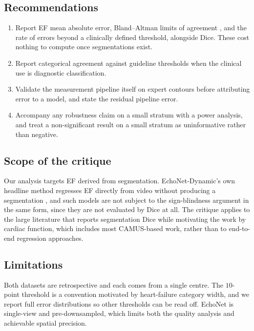 \documentclass[conference,a4paper]{IEEEtran}
\begin{document}
\subsection{Recommendations}
\begin{enumerate}
\item Report EF mean absolute error, Bland--Altman limits of agreement
      \cite{blandaltman1986}, and the rate of errors beyond a clinically defined threshold,
      alongside Dice. These cost nothing to compute once segmentations exist.
\item Report categorical agreement against guideline thresholds \cite{mcdonagh2021} when
      the clinical use is diagnostic classification.
\item Validate the measurement pipeline itself on expert contours before attributing error
      to a model, and state the residual pipeline error.
\item Accompany any robustness claim on a small stratum with a power analysis, and treat a
      non-significant result on a small stratum as uninformative rather than negative.
\end{enumerate}

\subsection{Scope of the critique}
Our analysis targets EF derived from segmentation. EchoNet-Dynamic's own headline method
regresses EF directly from video without producing a segmentation \cite{ouyang2020}, and
such models are not subject to the sign-blindness argument in the same form, since they are
not evaluated by Dice at all. The critique applies to the large literature that reports
segmentation Dice while motivating the work by cardiac function, which includes most
CAMUS-based work, rather than to end-to-end regression approaches.

\subsection{Limitations}
Both datasets are retrospective and each comes from a single centre. The $10$-point
threshold is a convention motivated by heart-failure category width, and we report full
error distributions so other thresholds can be read off. EchoNet is single-view and
pre-downsampled, which limits both the quality analysis and achievable spatial precision.
\end{document}
